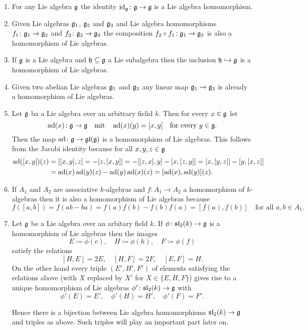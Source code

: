 \begin{expls}\label{expls: homomorphisms of Lie algebras}
 \begin{enumerate}[leftmargin=*]
  \item
   For any Lie algebra $\mathfrak{g}$ the identity $\operatorname{id}_{\mathfrak{g}} \colon \mathfrak{g} \to \mathfrak{g}$ is a Lie algebra homomorphism.
  \item
   Given Lie algebras $\mathfrak{g}_1$, $\mathfrak{g}_2$ and $\mathfrak{g}_3$ and Lie algebra homomorphisms $f_1 \colon \mathfrak{g}_1 \to \mathfrak{g}_2$ and $f_2 \colon \mathfrak{g}_2 \to \mathfrak{g}_3$ the composition $f_2 \circ f_1 \colon \mathfrak{g}_1 \to \mathfrak{g}_3$ is also a homomorphism of Lie algebras.
  \item
   If $\mathfrak{g}$ is a Lie algebra and $\mathfrak{h} \subseteq \mathfrak{g}$ a Lie subalgebra then the inclusion $\mathfrak{h} \hookrightarrow \mathfrak{g}$ is a homomorphism of Lie algebras.
  \item
   Given two abelian Lie algebras $\mathfrak{g}_1$ and $\mathfrak{g}_2$ any linear map $\mathfrak{g}_1 \to \mathfrak{g}_2$ is already a homomorphism of Lie algebras.
  \item
   Let $\mathfrak{g}$ ba a Lie algebra over an arbitrary fielid $k$. Then for every $x \in \mathfrak{g}$ let
   \[
    \operatorname{ad}(x) \colon \mathfrak{g} \to \mathfrak{g} \quad \text{mit} \quad \operatorname{ad}(x)(y) = [x,y]
    \quad \text{for every $y \in \mathfrak{g}$}.
   \]
   Then the map $\operatorname{ad} \colon \mathfrak{g} \to \mathfrak{gl}(\mathfrak{g})$ is a homomorphism of Lie algebras. This follows from the Jacobi identity because for all $x,y,z \in \mathfrak{g}$
   \begin{align*}
    \operatorname{ad}([x,y])(z)
    &= [[x,y],z]
    = -[z,[x,y]]
    = -[[z,x],y] -[x,[z,y]]
    = [x,[y,z]] - [y,[x,z]] \\
    &= \operatorname{ad}(x)\operatorname{ad}(y)(z) - \operatorname{ad}(y)\operatorname{ad}(x)(z)
    = [\operatorname{ad}(x),\operatorname{ad}(y)](z).
   \end{align*}
  \item
   If $A_1$ and $A_2$ are associative $k$-algebras and $f \colon A_1 \to A_2$ a homomorphism of $k$-algebras then it is also a homomorphism of Lie algebras because
   \[
    f([a,b]) = f(ab-ba) = f(a)f(b)-f(b)f(a) = [f(a),f(b)]
    \quad \text{for all $a,b \in A_1$}.
   \]
  \item
   Let $\mathfrak{g}$ be a Lie algebra over an arbitary field $k$. If $\phi \colon \mathfrak{sl}_2(k) \to \mathfrak{g}$ is a homomorphism of Lie algebras then the images
   \[
    E \coloneqq \phi(e), \quad H \coloneqq \phi(h), \quad F \coloneqq \phi(f)
   \]
   satisfy the relations
   \[
    [H,E] = 2E, \quad [H,F] = 2F, \quad [E,F] = H.
   \]
   On the other hand every triple $(E', H', F')$ of elements satisfying the relations above (with $X$ replaced by $X'$ for $X \in \{E,H,F\}$) gives rise to a unique homomorphism of Lie algebras $\phi' \colon \mathfrak{sl}_2(k) \to \mathfrak{g}$ with
   \[
    \phi'(E) = E', \quad \phi'(H) = H', \quad \phi'(F) = F'.
   \]
   
   Hence there is a bijection between Lie algebra homomorphisms $\mathfrak{sl}_2(k) \to \mathfrak{g}$ and triples as above. Such triples will play an important part later on.
 \end{enumerate}
\end{expls}


